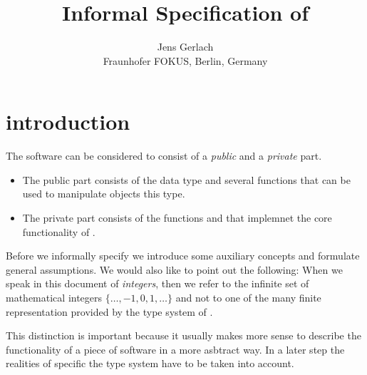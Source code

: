 \documentclass[paper=a4,DIV16,oneside,lefteqn]{scrartcl}
\title{Informal Specification of \bitwalker}
\author{Jens Gerlach\\
        {\small Fraunhofer FOKUS, Berlin, Germany}
       }
\date{}
\begin{document}
\maketitle
\tableofcontents

\section{introduction}

The \bitwalker software can be considered to consist of a \emph{public}
and a \emph{private} part.
\begin{itemize}
\item
The public part consists of the \isoc data type \bitwalkertype and several \isoc functions
that can be used to manipulate objects this type.

\item
The private part consists of the functions \peek and \poke
that implemnet the core functionality of \bitwalker.
\end{itemize}

Before we informally specify \bitwalker
we introduce some auxiliary concepts and formulate general assumptions.
We would also like to point out the following:
When we speak in this document of \emph{integers},
then we refer to the infinite set of mathematical
integers $\{\ldots, -1, 0, 1, \ldots\}$
and not to one of the many finite representation provided by the type system of \isoc.

This distinction is important because it usually makes more sense
to describe the functionality of a piece of software in a more
asbtract way.
In a later step the realities of specific the \isoc type system
have to be taken into account.




\end{document}
